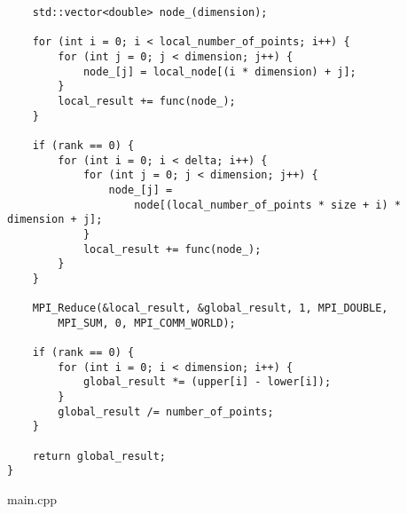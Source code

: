 \documentclass{report}
\begin{document}
\begin{lstlisting}
    std::vector<double> node_(dimension);

    for (int i = 0; i < local_number_of_points; i++) {
        for (int j = 0; j < dimension; j++) {
            node_[j] = local_node[(i * dimension) + j];
        }
        local_result += func(node_);
    }

    if (rank == 0) {
        for (int i = 0; i < delta; i++) {
            for (int j = 0; j < dimension; j++) {
                node_[j] =
                    node[(local_number_of_points * size + i) * dimension + j];
            }
            local_result += func(node_);
        }
    }

    MPI_Reduce(&local_result, &global_result, 1, MPI_DOUBLE,
        MPI_SUM, 0, MPI_COMM_WORLD);

    if (rank == 0) {
        for (int i = 0; i < dimension; i++) {
            global_result *= (upper[i] - lower[i]);
        }
        global_result /= number_of_points;
    }

    return global_result;
}
\end{lstlisting}
main.cpp
\end{document}
